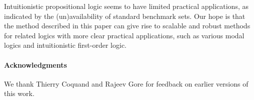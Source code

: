 \documentclass{llncs}
\begin{document}
Intuitionistic propositional logic seems to have limited practical applications, as indicated by the (un)availability of standard benchmark sets. Our hope is that the method described in this paper can give rise to scalable and robust methods for related logics with more clear practical applications, such as various modal logics and intuitionistic first-order logic.


\paragraph{Acknowledgments}
We thank Thierry Coquand and Rajeev Gore for feedback on earlier versions of
this work.




\end{document}
